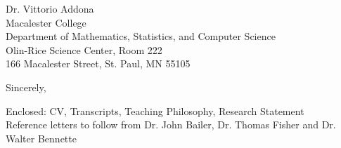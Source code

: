 \documentclass[11pt]{letter}\usepackage[]{graphicx}\usepackage[]{color}
\begin{document}
\begin{letter}{Dr. Vittorio Addona \\
Macalester College \\
Department of Mathematics, Statistics, and Computer Science\\
Olin-Rice Science Center, Room 222\\
166 Macalester Street, St. Paul, MN  55105
}
\addtolength{\medskipamount}{-1\medskipamount}
\closing{Sincerely,}


Enclosed: CV, Transcripts, Teaching Philosophy, Research Statement\\
Reference letters to follow from Dr. John Bailer, Dr. Thomas Fisher and Dr. Walter Bennette


\end{letter}
\end{document}
